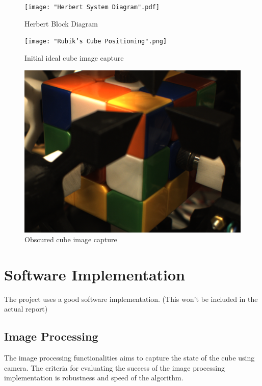 \documentclass[final, letterpaper, 10 pt, conference, twocolumn]{IEEEtran}
\begin{document}
\begin{figure}[!ht]
\centering
\texttt{[image: "Herbert System Diagram".pdf]}
\caption{Herbert Block Diagram}
\label{fig:System Block Diagram}
\end{figure}

\begin{figure}[!ht]
\centering
\texttt{[image: "Rubik's Cube Positioning".png]}
\caption{Initial ideal cube image capture}
\label{fig:Camera Positioning}
\end{figure}

\begin{figure}[!ht]
\centering
\includegraphics[scale=0.15]{actual_cube_capture.png}
\caption{Obscured cube image capture}
\label{fig:Obscured Cube}
\end{figure}

\section{Software Implementation}
\label{sec:Software Implementation}

The project uses a good software implementation. (This won't be included in the actual report)

\subsection{Image Processing}
The image processing functionalities aims to capture the state of the cube using camera. The criteria for evaluating the success of the image processing implementation is robustness and speed of the algorithm.
\end{document}
